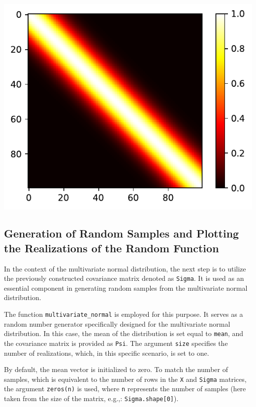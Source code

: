 \documentclass[
  letterpaper,
  DIV=11,
  numbers=noendperiod]{scrreprt}
\begin{document}
\includegraphics{006_num_gp_files/figure-pdf/cell-35-output-1.pdf}

\subsection{Generation of Random Samples and Plotting the Realizations
of the Random
Function}\label{generation-of-random-samples-and-plotting-the-realizations-of-the-random-function}

In the context of the multivariate normal distribution, the next step is
to utilize the previously constructed covariance matrix denoted as
\texttt{Sigma}. It is used as an essential component in generating
random samples from the multivariate normal distribution.

The function \texttt{multivariate\_normal} is employed for this purpose.
It serves as a random number generator specifically designed for the
multivariate normal distribution. In this case, the mean of the
distribution is set equal to \texttt{mean}, and the covariance matrix is
provided as \texttt{Psi}. The argument \texttt{size} specifies the
number of realizations, which, in this specific scenario, is set to one.

By default, the mean vector is initialized to zero. To match the number
of samples, which is equivalent to the number of rows in the \texttt{X}
and \texttt{Sigma} matrices, the argument \texttt{zeros(n)} is used,
where \texttt{n} represents the number of samples (here taken from the
size of the matrix, e.g.,: \texttt{Sigma.shape{[}0{]}}).
\end{document}
